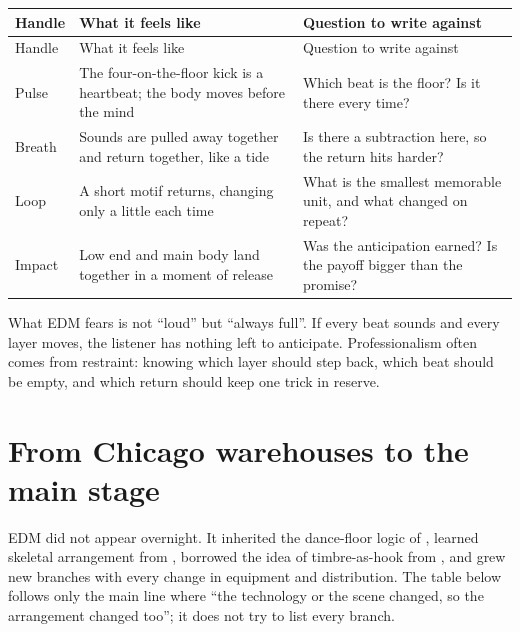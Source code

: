 \begin{longtable}{p{}p{}p{}}
\toprule
Handle & What it feels like & Question to write against \\
\midrule
\endfirsthead
\toprule
Handle & What it feels like & Question to write against \\
\midrule
\endhead
Pulse & The four-on-the-floor kick is a heartbeat; the body moves before the mind & Which beat is the floor? Is it there every time? \\
Breath & Sounds are pulled away together and return together, like a tide & Is there a subtraction here, so the return hits harder? \\
Loop & A short motif returns, changing only a little each time & What is the smallest memorable unit, and what changed on repeat? \\
Impact & Low end and main body land together in a moment of release & Was the anticipation earned? Is the payoff bigger than the promise? \\
\bottomrule
\end{longtable}

What EDM fears is not ``loud'' but ``always full''. If every beat sounds and every layer moves, the listener has nothing left to anticipate. Professionalism often comes from restraint: knowing which layer should step back, which beat should be empty, and which return should keep one trick in reserve.

\section{From Chicago warehouses to the main stage}
\label{sec:edm-history}

EDM did not appear overnight. It inherited the dance-floor logic of , learned skeletal arrangement from , borrowed the idea of timbre-as-hook from , and grew new branches with every change in equipment and distribution. The table below follows only the main line where ``the technology or the scene changed, so the arrangement changed too''; it does not try to list every branch.

